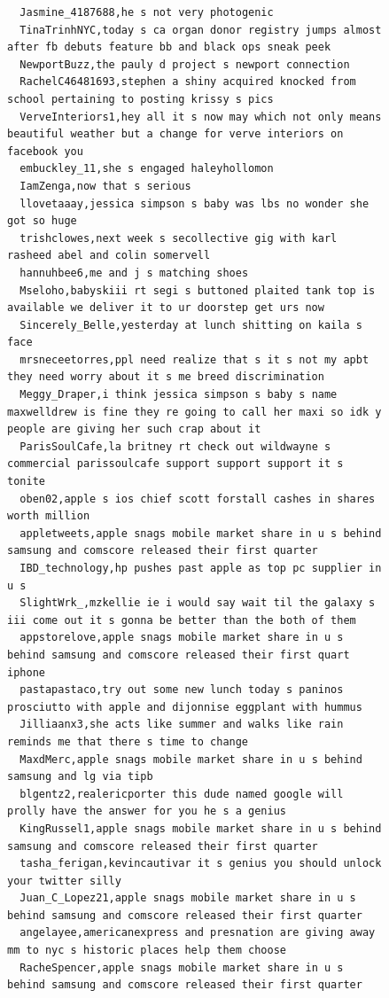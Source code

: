 \begin{figure}[htpb]
\begin{verbatim}
  Jasmine_4187688,he s not very photogenic
  TinaTrinhNYC,today s ca organ donor registry jumps almost after fb debuts feature bb and black ops sneak peek
  NewportBuzz,the pauly d project s newport connection
  RachelC46481693,stephen a shiny acquired knocked from school pertaining to posting krissy s pics
  VerveInteriors1,hey all it s now may which not only means beautiful weather but a change for verve interiors on facebook you
  embuckley_11,she s engaged haleyhollomon
  IamZenga,now that s serious
  llovetaaay,jessica simpson s baby was lbs no wonder she got so huge
  trishclowes,next week s secollective gig with karl rasheed abel and colin somervell
  hannuhbee6,me and j s matching shoes
  Mseloho,babyskiii rt segi s buttoned plaited tank top is available we deliver it to ur doorstep get urs now
  Sincerely_Belle,yesterday at lunch shitting on kaila s face
  mrsneceetorres,ppl need realize that s it s not my apbt they need worry about it s me breed discrimination
  Meggy_Draper,i think jessica simpson s baby s name maxwelldrew is fine they re going to call her maxi so idk y people are giving her such crap about it
  ParisSoulCafe,la britney rt check out wildwayne s commercial parissoulcafe support support support it s tonite
  oben02,apple s ios chief scott forstall cashes in shares worth million
  appletweets,apple snags mobile market share in u s behind samsung and comscore released their first quarter
  IBD_technology,hp pushes past apple as top pc supplier in u s
  SlightWrk_,mzkellie ie i would say wait til the galaxy s iii come out it s gonna be better than the both of them
  appstorelove,apple snags mobile market share in u s behind samsung and comscore released their first quart iphone
  pastapastaco,try out some new lunch today s paninos prosciutto with apple and dijonnise eggplant with hummus
  Jilliaanx3,she acts like summer and walks like rain reminds me that there s time to change
  MaxdMerc,apple snags mobile market share in u s behind samsung and lg via tipb
  blgentz2,realericporter this dude named google will prolly have the answer for you he s a genius
  KingRussel1,apple snags mobile market share in u s behind samsung and comscore released their first quarter
  tasha_ferigan,kevincautivar it s genius you should unlock your twitter silly
  Juan_C_Lopez21,apple snags mobile market share in u s behind samsung and comscore released their first quarter
  angelayee,americanexpress and presnation are giving away mm to nyc s historic places help them choose
  RacheSpencer,apple snags mobile market share in u s behind samsung and comscore released their first quarter

\end{verbatim}
\end{figure}

